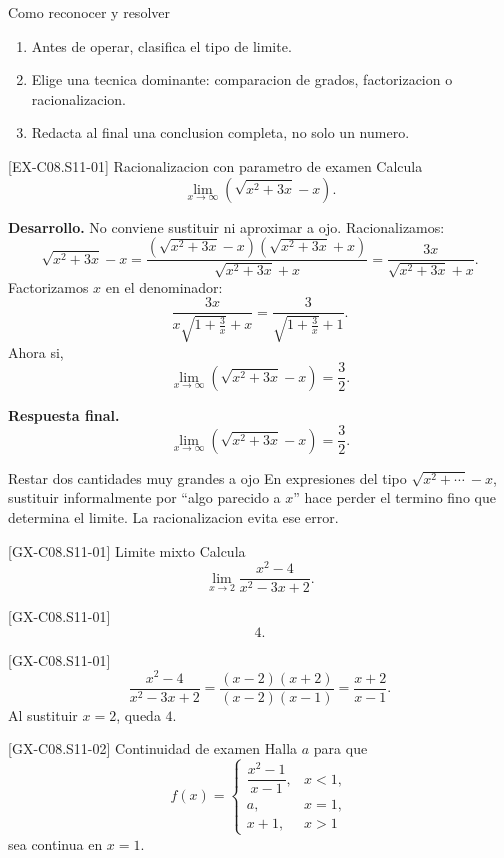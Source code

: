 \begin{methodbox}{Como reconocer y resolver}
\begin{enumerate}
  \item Antes de operar, clasifica el tipo de limite.
  \item Elige una tecnica dominante: comparacion de grados, factorizacion o racionalizacion.
  \item Redacta al final una conclusion completa, no solo un numero.
\end{enumerate}
\end{methodbox}

\begin{solvedexample}{[EX-C08.S11-01] Racionalizacion con parametro de examen}
Calcula
\[
\lim_{x\to\infty}\left(\sqrt{x^2+3x}-x\right).
\]

\textbf{Desarrollo.} No conviene sustituir ni aproximar a ojo. Racionalizamos:
\[
\sqrt{x^2+3x}-x=
\frac{(\sqrt{x^2+3x}-x)(\sqrt{x^2+3x}+x)}{\sqrt{x^2+3x}+x}
=\frac{3x}{\sqrt{x^2+3x}+x}.
\]
Factorizamos \(x\) en el denominador:
\[
\frac{3x}{x\sqrt{1+\frac{3}{x}}+x}
=\frac{3}{\sqrt{1+\frac{3}{x}}+1}.
\]
Ahora si,
\[
\lim_{x\to\infty}\left(\sqrt{x^2+3x}-x\right)=\frac{3}{2}.
\]

\textbf{Respuesta final.}
\[
\lim_{x\to\infty}\left(\sqrt{x^2+3x}-x\right)=\frac{3}{2}.
\]
\end{solvedexample}

\begin{commonerror}{Restar dos cantidades muy grandes a ojo}
En expresiones del tipo \(\sqrt{x^2+\cdots}-x\), sustituir informalmente por ``algo parecido a
\(x\)'' hace perder el termino fino que determina el limite. La racionalizacion evita ese error.
\end{commonerror}

\begin{guidedexercise}{[GX-C08.S11-01] Limite mixto}
Calcula
\[
\lim_{x\to 2}\frac{x^2-4}{x^2-3x+2}.
\]
\end{guidedexercise}

\begin{shortanswer}{[GX-C08.S11-01]}
\[
4.
\]
\end{shortanswer}

\begin{fullsolution}{[GX-C08.S11-01]}
\[
\frac{x^2-4}{x^2-3x+2}=
\frac{(x-2)(x+2)}{(x-2)(x-1)}=\frac{x+2}{x-1}.
\]
Al sustituir \(x=2\), queda \(4\).
\end{fullsolution}

\begin{guidedexercise}{[GX-C08.S11-02] Continuidad de examen}
Halla \(a\) para que
\[
f(x)=
\begin{cases}
\dfrac{x^2-1}{x-1},& x<1,\\
a,& x=1,\\
x+1,& x>1
\end{cases}
\]
sea continua en \(x=1\).
\end{guidedexercise}

